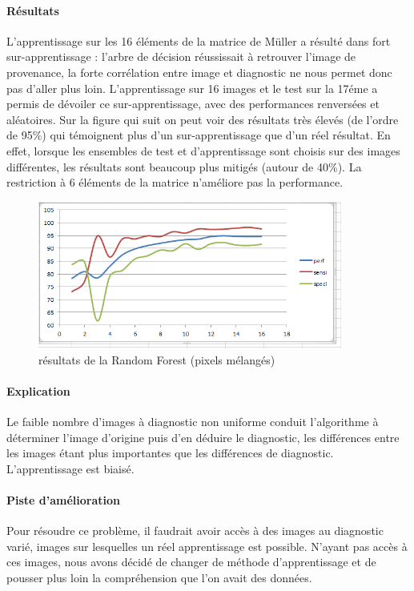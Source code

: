 \documentclass[a4paper,10pt]{report}
\begin{document}
\paragraph{Résultats}
L'apprentissage sur les 16 éléments de la matrice de Müller a résulté dans fort sur-apprentissage : l'arbre de décision réussissait à retrouver l'image de provenance, la forte corrélation entre image et diagnostic ne nous permet donc pas d'aller plus loin. L'apprentissage sur 16 images et le test sur la 17éme a permis de dévoiler ce sur-apprentissage, avec des performances renversées et aléatoires. Sur la figure qui suit on peut voir des résultats très élevés (de l'ordre de 95\%) qui témoignent plus d'un sur-apprentissage que d'un réel résultat. En effet, lorsque les ensembles de test et d'apprentissage sont choisis sur des images différentes, les résultats sont beaucoup plus mitigés (autour de 40\%). La restriction à 6 éléments de la matrice n'améliore pas la performance. 
\begin{figure}[htbp]
  \caption{résultats de la Random Forest (pixels mélangés)}
  \centering
  \includegraphics[width=10cm]{RandomForestPerf.png}
\end{figure}
\paragraph{Explication}
Le faible nombre d'images à diagnostic non uniforme conduit l'algorithme à déterminer l'image d’origine puis d’en déduire le diagnostic, les différences entre les images étant plus importantes que les différences de diagnostic. L'apprentissage est biaisé. 
\paragraph{Piste d'amélioration}
Pour résoudre ce problème, il faudrait avoir accès à des images au diagnostic varié, images sur lesquelles un réel apprentissage est possible. N’ayant pas accès à ces images, nous avons décidé de changer de méthode d'apprentissage et de pousser plus loin la compréhension que l'on avait des données.
\end{document}
